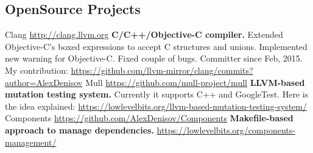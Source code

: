 \documentclass[11pt,a4paper]{moderncv}
\begin{document}
  \subsection{OpenSource Projects}
  \cvline
    {Clang}
    {\url{http://clang.llvm.org}\newline{}
    \textbf{C/C++/Objective-C compiler.}\newline{}
    Extended Objective-C's boxed expressions to accept C structures and unions.\newline{}
    Implemented new warning for Objective-C.\newline{}
    Fixed couple of bugs.\newline{}
    Committer since Feb, 2015.\newline{}
    My contribution:\newline{}
    \url{https://github.com/llvm-mirror/clang/commits?author=AlexDenisov}
    }
  \cvline
    {Mull}
    {\url{https://github.com/mull-project/mull}\newline{}
    \textbf{LLVM-based mutation testing system.}\newline{}
    Currently it supports C++ and GoogleTest.\newline{}
    Here is the idea explained:\newline{}
    \url{https://lowlevelbits.org/llvm-based-mutation-testing-system/}
    }
  \cvline
    {Components}
    {\url{https://github.com/AlexDenisov/Components}\newline{}
    \textbf{Makefile-based approach to manage dependencies.}\newline{}
    \url{https://lowlevelbits.org/components-management/}
    }
\pagebreak
\end{document}
